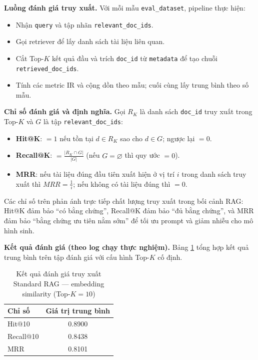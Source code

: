 \textbf{Luồng đánh giá truy xuất.} Với mỗi mẫu \texttt{eval\_dataset}, pipeline thực hiện:
\begin{itemize}
    \item Nhận \texttt{query} và tập nhãn \texttt{relevant\_doc\_ids}.
    \item Gọi retriever để lấy danh sách tài liệu liên quan. 
    \item Cắt Top-$K$ kết quả đầu và trích \texttt{doc\_id} từ \texttt{metadata} để tạo chuỗi \texttt{retrieved\_doc\_ids}.
    \item Tính các metric IR và cộng dồn theo mẫu; cuối cùng lấy trung bình theo số mẫu.
\end{itemize}

\textbf{Chỉ số đánh giá và định nghĩa.} Gọi \(R_K\) là danh sách \texttt{doc\_id} truy xuất trong Top-$K$ và \(G\) là tập \texttt{relevant\_doc\_ids}:
\begin{itemize}
    \item \textbf{Hit@K}: \(=1\) nếu tồn tại \(d \in R_K\) sao cho \(d \in G\); ngược lại \(=0\).
    \item \textbf{Recall@K}: \(=\frac{|R_K \cap G|}{|G|}\) (nếu \(G=\varnothing\) thì quy ước \(=0\)).
    \item \textbf{MRR}: nếu tài liệu đúng đầu tiên xuất hiện ở vị trí \(i\) trong danh sách truy xuất thì \(MRR=\frac{1}{i}\); nếu không có tài liệu đúng thì \(=0\).
\end{itemize}
Các chỉ số trên phản ánh trực tiếp chất lượng truy xuất trong bối cảnh RAG: Hit@K đảm bảo ``có bằng chứng'', Recall@K đảm bảo ``đủ bằng chứng'', và MRR đảm bảo ``bằng chứng ưu tiên nằm sớm'' để tối ưu prompt và giảm nhiễu cho mô hình sinh.

\textbf{Kết quả đánh giá (theo log chạy thực nghiệm).} Bảng \ref{tab:rag_eval_results} tổng hợp kết quả trung bình trên tập đánh giá với cấu hình Top-$K$ cố định.

\begin{table}[H]
\centering
\begin{tabular}{|l|c|}
\hline
\textbf{Chỉ số} & \textbf{Giá trị trung bình} \\
\hline
Hit@10 & 0.8900 \\
\hline
Recall@10 & 0.8438 \\
\hline
MRR & 0.8101 \\
\hline
\end{tabular}
\caption{Kết quả đánh giá truy xuất Standard RAG --- embedding similarity (Top-$K=10$)}
\label{tab:rag_eval_results}
\end{table}

